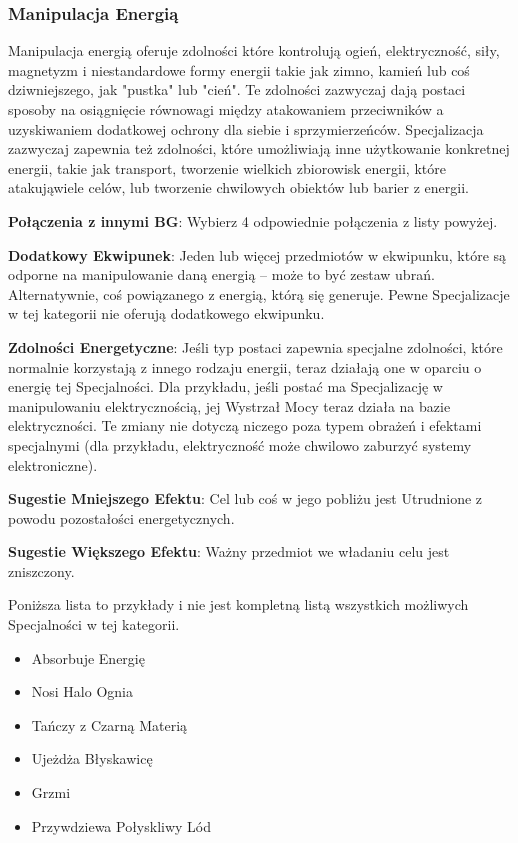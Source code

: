 \subsubsection{Manipulacja Energią}

Manipulacja energią oferuje zdolności które kontrolują ogień, elektryczność, siły, magnetyzm i niestandardowe formy energii takie jak zimno, kamień lub coś dziwniejszego, jak "pustka" lub "cień". Te zdolności zazwyczaj dają postaci sposoby na osiągnięcie równowagi między atakowaniem przeciwników a uzyskiwaniem dodatkowej ochrony dla siebie i sprzymierzeńców. Specjalizacja zazwyczaj zapewnia też zdolności, które umożliwiają inne użytkowanie konkretnej energii, takie jak transport, tworzenie wielkich zbiorowisk energii, które atakująwiele celów, lub tworzenie chwilowych obiektów lub barier z energii. 

\textbf{Połączenia z innymi BG}: Wybierz 4 odpowiednie połączenia z listy powyżej.

\textbf{Dodatkowy Ekwipunek}: Jeden lub więcej przedmiotów w ekwipunku, które są odporne na manipulowanie daną energią – może to być zestaw ubrań. Alternatywnie, coś powiązanego z energią, którą się generuje. Pewne Specjalizacje w tej kategorii nie oferują dodatkowego ekwipunku.

\textbf{Zdolności Energetyczne}: Jeśli typ postaci zapewnia specjalne zdolności, które normalnie korzystają z innego rodzaju energii, teraz działają one w oparciu o energię tej Specjalności. Dla przykładu, jeśli postać ma Specjalizację w manipulowaniu elektrycznością, jej Wystrzał Mocy teraz działa na bazie elektryczności. Te zmiany nie dotyczą niczego poza typem obrażeń i efektami specjalnymi (dla przykładu, elektryczność może chwilowo zaburzyć systemy elektroniczne).

\textbf{Sugestie Mniejszego Efektu}: Cel lub coś w jego pobliżu jest Utrudnione z powodu pozostałości energetycznych.

\textbf{Sugestie Większego Efektu}: Ważny przedmiot we władaniu celu jest zniszczony.

Poniższa lista to przykłady i nie jest kompletną listą wszystkich możliwych Specjalności w tej kategorii.

\begin{itemize}
\item Absorbuje Energię
\item Nosi Halo Ognia
\item Tańczy z Czarną Materią
\item Ujeżdża Błyskawicę
\item Grzmi
\item Przywdziewa Połyskliwy Lód
\end{itemize}    
    
